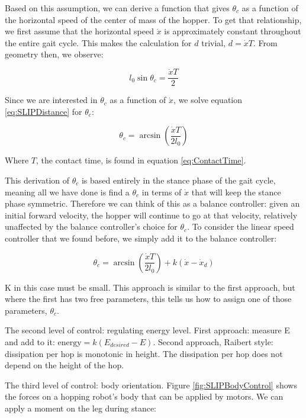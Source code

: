 Based on this assumption, we can derive a function that gives $\theta_{c}$ as a function of the horizontal speed of the center of mass of the hopper. To get that relationship, we first assume that the horizontal speed $\dot{x}$ is approximately constant throughout the entire gait cycle. This makes the calculation for $d$ trivial, $d=\dot{x}T$. From geometry then, we observe:

\begin{equation}
l_{0}\sin{\theta_{c}}=\frac{\dot{x}T}{2}
\label{eq:SLIPDistance}
\end{equation}

Since we are interested in $\theta_{c}$ as a function of $\dot{x}$, we solve equation \ref{eq:SLIPDistance} for $\theta_{c}$:

\begin{equation}
\theta_{c}=\arcsin{\left(\frac{\dot{x}T}{2l_{0}}\right)}
\label{eq:SLIPContactAngleBalance}
\end{equation}

Where $T$, the contact time, is found in equation \ref{eq:ContactTime}.

This derivation of $\theta_{c}$ is based entirely in the stance phase of the gait cycle, meaning all we have done is find a $\theta_{c}$ in terms of $\dot{x}$ that will keep the stance phase symmetric. Therefore we can think of this as a balance controller: given an initial forward velocity, the hopper will continue to go at that velocity, relatively unaffected by the balance controller's choice for $\theta_{c}$. To consider the linear speed controller that we found before, we simply add it to the balance controller:

\begin{equation}
\theta_{c}=\arcsin{\left(\frac{\dot{x}T}{2l_{0}}\right)}+k\left(\dot{x}-\dot{x}_{d}\right)
\label{eq:HopperController}
\end{equation}

K in this case must be small. This approach is similar to the first approach, but where the first has two free parameters, this tells us how to assign one of those parameters, $\theta_{c}$.

The second level of control: regulating energy level. First approach: measure E and add to it: $\mbox{energy}=k(E_{desired}-E)$. Second approach, Raibert style: dissipation per hop is monotonic in height. The dissipation per hop does not depend on the height of the hop. 

The third level of control: body orientation. Figure \ref{fig:SLIPBodyControl} shows the forces on a hopping robot's body that can be applied by motors. We can apply a moment on the leg during stance:


